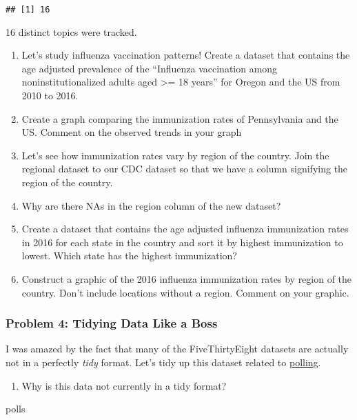 \documentclass[]{article}
\newenvironment{Shaded}{\begin{snugshade}}{\end{snugshade}}
\newcommand{\NormalTok}[1]{#1}
\providecommand{\tightlist}{%
  \setlength{\itemsep}{0pt}\setlength{\parskip}{0pt}}
\begin{document}
\begin{verbatim}
## [1] 16
\end{verbatim}

16 distinct topics were tracked.

\begin{enumerate}
\def\labelenumi{\alph{enumi}.}
\setcounter{enumi}{1}
\item
  Let's study influenza vaccination patterns! Create a dataset that
  contains the age adjusted prevalence of the ``Influenza vaccination
  among noninstitutionalized adults aged \textgreater{}= 18 years'' for
  Oregon and the US from 2010 to 2016.
\item
  Create a graph comparing the immunization rates of Pennsylvania and
  the US. Comment on the observed trends in your graph
\item
  Let's see how immunization rates vary by region of the country. Join
  the regional dataset to our CDC dataset so that we have a column
  signifying the region of the country.
\item
  Why are there NAs in the region column of the new dataset?
\item
  Create a dataset that contains the age adjusted influenza immunization
  rates in 2016 for each state in the country and sort it by highest
  immunization to lowest. Which state has the highest immunization?
\item
  Construct a graphic of the 2016 influenza immunization rates by region
  of the country. Don't include locations without a region. Comment on
  your graphic.
\end{enumerate}

\subsubsection{Problem 4: Tidying Data Like a
Boss}\label{problem-4-tidying-data-like-a-boss}

I was amazed by the fact that many of the FiveThirtyEight datasets are
actually not in a perfectly \emph{tidy} format. Let's tidy up this
dataset related to
\href{https://projects.fivethirtyeight.com/congress-generic-ballot-polls/}{polling}.

\begin{enumerate}
\def\labelenumi{\alph{enumi}.}
\tightlist
\item
  Why is this data not currently in a tidy format?
\end{enumerate}

\begin{Shaded}
\begin{Highlighting}[]
\NormalTok{polls}
\end{Highlighting}
\end{Shaded}
\end{document}
